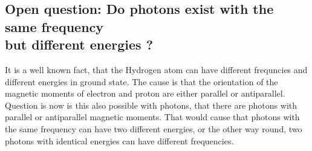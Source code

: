 \documentclass[10pt,titlepage]{article}
\begin{document}

\subsection{Open question: Do photons exist with the same frequency\\ but different energies ?}
It is a well known fact, that the Hydrogen atom can have different frequncies and different energies in ground state. The cause is that the orientation of the magnetic moments of electron and proton are either parallel or antiparallel.\\
Question is now is this also possible with photons, that there are photons with parallel or antiparallel magnetic moments. That would cause that photons with the same frequency can have two different energies, or the other way round, two photons with identical energies can have different frequencies.
\\

\end{document}
